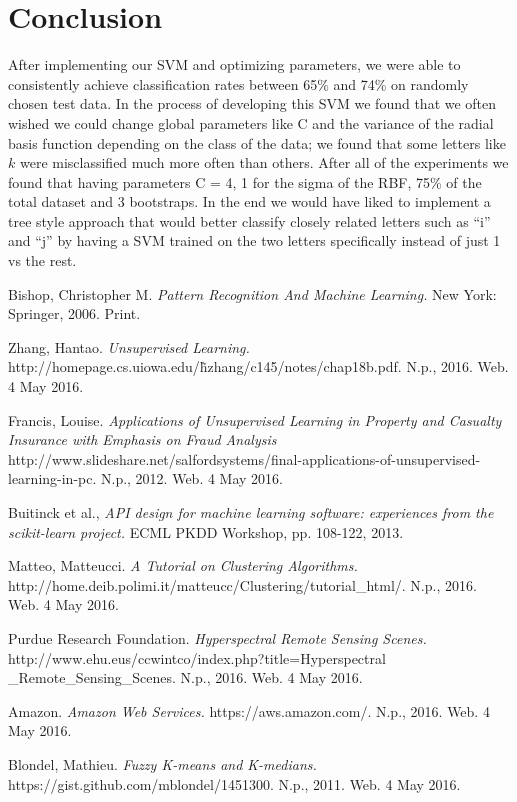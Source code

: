 \documentclass[journal]{IEEEtran}
\begin{document}
\section{Conclusion}
After implementing our SVM and optimizing parameters, we were able to consistently achieve classification rates between 65\% and 74\% on randomly chosen test data. In the process of developing this SVM we found that we often wished we could change global parameters like C and the variance of the radial basis function depending on the class of the data; we found that some letters like $k$ were misclassified much more often than others. After all of the experiments we found that having parameters C = 4, 1 for the sigma of the RBF, 75\% of the total dataset and 3 bootstraps. In the end we would have liked to implement a tree style approach that would better classify closely related letters such as “i” and “j” by having a SVM trained on the two letters specifically instead of just 1 vs the rest.


\ifCLASSOPTIONcaptionsoff
  \newpage
\fi

\begin{thebibliography}{1}

  Bishop, Christopher M. \emph{Pattern Recognition And Machine Learning.} New York: Springer, 2006. Print.

  Zhang, Hantao. \emph{Unsupervised Learning.} http://homepage.cs.uiowa.edu/\~hzhang/c145/notes/chap18b.pdf. N.p., 2016. Web. 4 May 2016.

  Francis, Louise. \emph{Applications of Unsupervised Learning in Property and Casualty Insurance with Emphasis on Fraud Analysis} http://www.slideshare.net/salfordsystems/final-applications-of-unsupervised-learning-in-pc. N.p., 2012. Web. 4 May 2016.

  Buitinck et al., \emph{API design for machine learning software: experiences from the scikit-learn project.} ECML PKDD Workshop, pp. 108-122, 2013.

  Matteo, Matteucci. \emph{A Tutorial on Clustering Algorithms.} http://home.deib.polimi.it/matteucc/Clustering/tutorial\_html/. N.p., 2016. Web. 4 May 2016.

  Purdue Research Foundation. \emph{Hyperspectral Remote Sensing Scenes.} http://www.ehu.eus/ccwintco/index.php?title=Hyperspectral \_Remote\_Sensing\_Scenes. N.p., 2016. Web. 4 May 2016.

  Amazon. \emph{Amazon Web Services.} https://aws.amazon.com/. N.p., 2016. Web. 4 May 2016.

  Blondel, Mathieu. \emph{Fuzzy K-means and K-medians.} https://gist.github.com/mblondel/1451300. N.p., 2011. Web. 4 May 2016.

\end{thebibliography}
\end{document}
